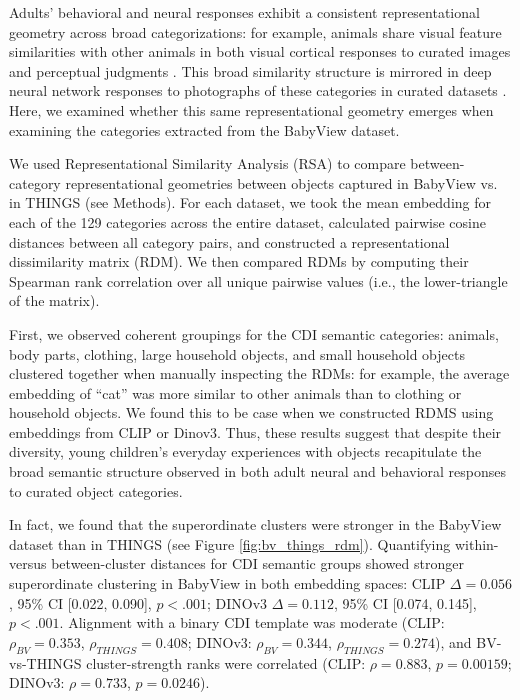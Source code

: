 Adults' behavioral and neural responses exhibit a consistent representational geometry across broad categorizations: for example, animals share visual feature similarities with other animals in both visual cortical responses to curated images and perceptual judgments \citep{konkle2013tripartite, kriegeskorte2008representational, hebart2023things, long2018mid}. This broad similarity structure is mirrored in deep neural network responses to photographs of these categories in curated datasets \citep{muttenthaler2021thingsvision, conwell2024large}. Here, we examined whether this same representational geometry emerges when examining the categories extracted from the BabyView dataset. 

We used Representational Similarity Analysis (RSA) to compare between-category representational geometries between objects captured in BabyView vs. in THINGS (see Methods).  For each dataset, we took the mean embedding for each of the 129 categories across the entire dataset, calculated pairwise cosine distances between all category pairs, and constructed a representational dissimilarity matrix (RDM). We then compared RDMs by computing their Spearman rank correlation over all unique pairwise values (i.e., the lower-triangle of the matrix).  

First, we observed coherent groupings for the CDI semantic categories: animals, body parts, clothing, large household objects, and small household objects clustered together when manually inspecting the RDMs: for example, the average embedding of ``cat'' was more similar to other animals than to clothing or household objects. We found this to be case when we constructed RDMS using embeddings from CLIP or Dinov3.  Thus, these results suggest that despite their diversity, young children's everyday experiences with objects recapitulate the broad semantic structure observed in both adult neural and behavioral responses to curated object categories.


In fact, we found that the superordinate clusters were stronger in the BabyView dataset than in THINGS (see Figure \ref{fig:bv_things_rdm}). Quantifying within- versus between-cluster distances for CDI semantic groups showed stronger superordinate clustering in BabyView in both embedding spaces: CLIP $\Delta=0.056$, 95\% CI [0.022, 0.090], $p<.001$; DINOv3 $\Delta=0.112$, 95\% CI [0.074, 0.145], $p<.001$. Alignment with a binary CDI template was moderate (CLIP: $\rho_{BV}=0.353$, $\rho_{THINGS}=0.408$; DINOv3: $\rho_{BV}=0.344$, $\rho_{THINGS}=0.274$), and BV-vs-THINGS cluster-strength ranks were correlated (CLIP: $\rho=0.883$, $p=0.00159$; DINOv3: $\rho=0.733$, $p=0.0246$).

